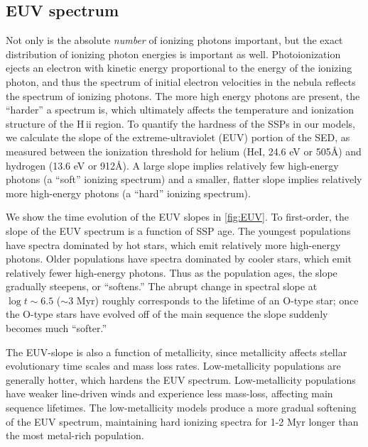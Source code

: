 \documentclass[trackchanges, twocolumn, tighten]{aastex61}
\newcommand{\Fig}[1]{\autoref{fig:#1}}
\newcommand{\hii}{H\,{\sc ii}\xspace}
\newcommand{\ang}{\ensuremath{\mbox{\AA}}}
\begin{document}
\subsection{EUV spectrum}\label{sec:spectra:EUV}

Not only is the absolute \emph{number} of ionizing photons important, but the exact distribution of ionizing photon energies is important as well. Photoionization ejects an electron with kinetic energy proportional to the energy of the ionizing photon, and thus the spectrum of initial electron velocities in the nebula reflects the spectrum of ionizing photons. The more high energy photons are present, the ``harder'' a spectrum is, which ultimately affects the temperature and ionization structure of the \hii region. To quantify the hardness of the SSPs in our models, we calculate the slope of the extreme-ultraviolet (EUV) portion of the SED, as measured between the ionization threshold for helium (HeI, 24.6 eV or 505\ang{}) and hydrogen (13.6 eV or 912\ang{}). A large slope implies relatively few high-energy photons (a ``soft'' ionizing spectrum) and a smaller, flatter slope implies relatively more high-energy photons (a ``hard'' ionizing spectrum). 

We show the time evolution of the EUV slopes in \Fig{EUV}. To first-order, the slope of the EUV spectrum is a function of SSP age. The youngest populations have spectra dominated by hot stars, which emit relatively more high-energy photons. Older populations have spectra dominated by cooler stars, which emit relatively fewer high-energy photons. Thus as the population ages, the slope gradually steepens, or ``softens.'' The abrupt change in spectral slope at $\log t \sim 6.5$ ($\sim 3$ Myr) roughly corresponds to the lifetime of an O-type star; once the O-type stars have evolved off of the main sequence the slope suddenly becomes much ``softer.''

The EUV-slope is also a function of metallicity, since metallicity affects stellar evolutionary time scales and mass loss rates. Low-metallicity populations are generally hotter, which hardens the EUV spectrum. Low-metallicity populations have weaker line-driven winds and experience less mass-loss, affecting main sequence lifetimes. The low-metallicity models produce a more gradual softening of the EUV spectrum, maintaining hard ionizing spectra for 1-2 Myr longer than the most metal-rich population. 
\end{document}
